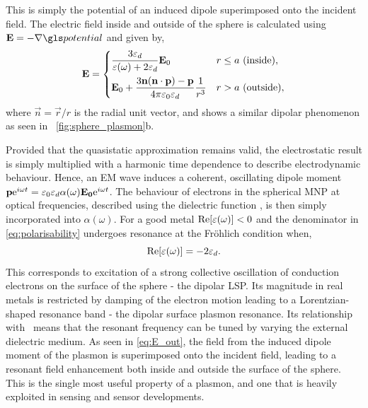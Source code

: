 \documentclass{article}
\begin{document}
This is simply the potential of an induced dipole superimposed onto the incident field. The electric field inside and outside of the sphere is calculated using $\vec{E}=-\nabla\pot$ and given by,
\begin{equation}
	\mathbf{E} =
	\begin{dcases}
	\frac{3\varepsilon_d}{\varepsilon(\omega)+2\varepsilon_d} \mathbf{E}_0 & r \leq a\text{ (inside)}, \\
	\mathbf{E}_0 + \frac{3\mathbf{n}(\mathbf{n}\cdot\mathbf{p}) - \mathbf{p}}{4\pi\varepsilon_0\varepsilon_d}\frac{1}{r^3} & r > a\text{ (outside)},
	\end{dcases}
	\label{eq:E_out}
\end{equation}
where $\vec{n}=\vec{r}/r$ is the radial unit vector, and shows a similar dipolar phenomenon as seen in \figurename~\ref{fig:sphere_plasmon}b.

Provided that the quasistatic approximation remains valid, the electrostatic result is simply multiplied with a harmonic time dependence to describe electrodynamic behaviour. Hence, an EM wave induces a coherent, oscillating dipole moment $\mathbf{p}\mathrm{e}^{i\omega t}=\varepsilon_0\varepsilon_d\alpha(\omega)\mathbf{E_0}\mathrm{e}^{i\omega t}$. The behaviour of electrons in the spherical MNP at optical frequencies, described using the dielectric function \dielectric, is then simply incorporated into $\alpha(\omega)$. For a good metal $\mathrm{Re}\!\left[{\varepsilon(\omega)}\right]<0$ and the denominator in \eqref{eq:polarisability} undergoes resonance
at the Fr\"{o}hlich condition when,
\begin{equation}
	\mathrm{Re}\!\left[{\varepsilon(\omega)}\right] = -2\varepsilon_d. \label{eq:frohlich}
\end{equation}
This corresponds to excitation of a strong collective oscillation of conduction electrons on the surface of the sphere - the dipolar LSP. Its magnitude in real metals is restricted by damping of the electron motion leading to a Lorentzian-shaped resonance band - the dipolar surface plasmon resonance. Its relationship with \epsdi\ means that the resonant frequency can be tuned by varying the external dielectric medium. As seen in \eqref{eq:E_out}, the field from the induced dipole moment of the plasmon is superimposed onto the incident field, leading to a resonant field enhancement both inside and outside the surface of the sphere. This is the single most useful property of a plasmon, and one that is heavily exploited in sensing and sensor developments.
\end{document}
